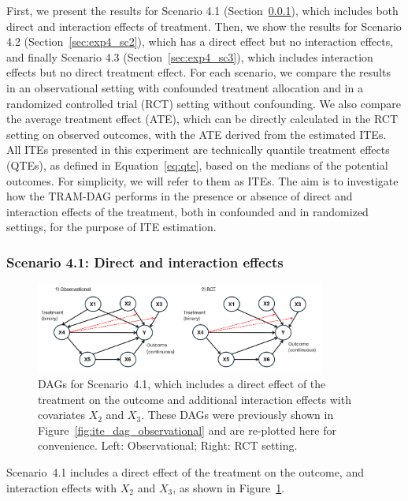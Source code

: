 First, we present the results for Scenario 4.1 (Section~\ref{sec:exp4_sc1}), which includes both direct and interaction effects of treatment. Then, we show the results for Scenario 4.2 (Section~\ref{sec:exp4_sc2}), which has a direct effect but no interaction effects, and finally Scenario 4.3 (Section~\ref{sec:exp4_sc3}), which includes interaction effects but no direct treatment effect. For each scenario, we compare the results in an observational setting with confounded treatment allocation and in a randomized controlled trial (RCT) setting without confounding. We also compare the average treatment effect (ATE), which can be directly calculated in the RCT setting on observed outcomes, with the ATE derived from the estimated ITEs. All ITEs presented in this experiment are technically quantile treatment effects (QTEs), as defined in Equation~\ref{eq:qte}, based on the medians of the potential outcomes. For simplicity, we will refer to them as ITEs. The aim is to investigate how the TRAM-DAG performs in the presence or absence of direct and interaction effects of the treatment, both in confounded and in randomized settings, for the purpose of ITE estimation.

\subsubsection{Scenario 4.1: Direct and interaction effects} \label{sec:exp4_sc1}


\begin{figure}[H]
\centering
\includegraphics[width=0.85\textwidth]{img/exp4_dags.png}
\caption{DAGs for Scenario~4.1, which includes a direct effect of the treatment on the outcome and additional interaction effects with covariates $X_2$ and $X_3$. These DAGs were previously shown in Figure~\ref{fig:ite_dag_observational} and are re-plotted here for convenience. Left: Observational; Right: RCT setting.}
\label{fig:ite_dag_observational_1}
\end{figure}

Scenario~4.1 includes a direct effect of the treatment on the outcome, and interaction effects with $X_2$ and $X_3$, as shown in Figure~\ref{fig:ite_dag_observational_1}.

